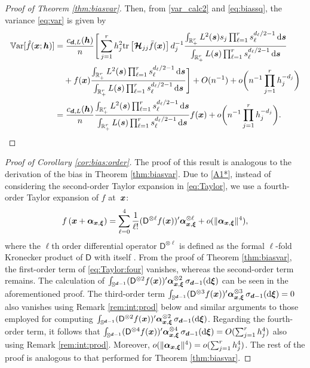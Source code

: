 \documentclass[oneside,11pt]{article}
\begin{document}
\begin{proof}[Proof of Theorem \ref{thm:biasvar}]
Then, from \eqref{var_calc2} and \eqref{eq:biassq}, the variance \eqref{eq:var} is given by
\begin{align*}
	\mathbb{V}\mathrm{ar}[\hat{f}(\bx;\bh)]=&\;\frac{c_{\bd,L}(\bh)}{n}
	\Bigg[\sum_{j=1}^rh_j^2\tr{\bHcal_{jj}\bar{f}(\bx)}d_j^{-1}\frac{\int_{\R_+^r}L^2(\bs)s_j\prod_{\ell=1}^r s_\ell^{d_\ell/2-1}\,\rd \bs}{\int_{\R_+^r}L(\bs)\prod_{\ell=1}^rs_\ell^{d_\ell/2-1}\,\rd \bs}\nonumber\\
        &+ f(\bx)\frac{\int_{\R_+^r}L^2(\bs)\prod_{\ell=1}^r s_\ell^{d_\ell/2-1}\,\rd \bs}{\int_{\R_+^r}L(\bs)\prod_{\ell=1}^rs_\ell^{d_\ell/2-1}\,\rd \bs}\Bigg]%
        +O(n^{-1})+o\bigg(n^{-1}\prod_{j=1}^r h_j^{-d_j}\bigg)\nonumber\\
	=&\;\frac{c_{\bd,L}(\bh)}{n} \frac{\int_{\R_+^r}L^2(\bs)\prod_{\ell=1}^r s_\ell^{d_\ell/2-1}\,\rd \bs}{\int_{\R_+^r}L(\bs)\prod_{\ell=1}^rs_\ell^{d_\ell/2-1}\,\rd \bs}f(\bx)+o\bigg(n^{-1}\prod_{j=1}^r h_j^{-d_j}\bigg).
\end{align*}
\end{proof}

\begin{proof}[Proof of Corollary \ref{cor:bias:order}]
The proof of this result is analogous to the derivation of the bias in Theorem \ref{thm:biasvar}. Due to \ref{A1*}, instead of considering the second-order Taylor expansion in \eqref{eq:Taylor}, we use a fourth-order Taylor expansion of $f$ at~$\boldsymbol{x}$:
\begin{align}\label{eq:Taylor:four}
f\left(\boldsymbol{x}+\boldsymbol\alpha_{\boldsymbol{x},\boldsymbol\xi}\right)=\sum_{\ell=0}^4\frac{1}{\ell!}(\mathsf{D}^{\otimes \ell}f(\boldsymbol{x}))'\boldsymbol\alpha_{\boldsymbol{x},\boldsymbol\xi}^{\otimes \ell}+o(\|\boldsymbol\alpha_{\boldsymbol{x},\boldsymbol\xi}\|^4),
\end{align}
where the $\ell$th order differential operator $\mathsf{D}^{\otimes \ell}$ is defined as the formal $\ell$-fold Kronecker product of $\mathsf{D}$ with itself \citep[Section 2.6]{Chacon2018}. From the proof of Theorem \ref{thm:biasvar}, the first-order term of \eqref{eq:Taylor:four} vanishes, whereas the second-order term remains. The calculation of $\int_{\mathbb{S}^{\boldsymbol{d}-1}}(\mathsf{D}^{\otimes 2}f(\boldsymbol{x}))'\boldsymbol\alpha_{\boldsymbol{x},\boldsymbol\xi}^{\otimes 2}\,\sigma_{\boldsymbol{d}-1}(\mathrm{d}\boldsymbol\xi)$ can be seen in the aforementioned proof. The third-order term $\int_{\mathbb{S}^{\boldsymbol{d}-1}}(\mathsf{D}^{\otimes 3}f(\boldsymbol{x}))'\boldsymbol\alpha_{\boldsymbol{x},\boldsymbol\xi}^{\otimes 3}\,\sigma_{\boldsymbol{d}-1}(\mathrm{d}\boldsymbol\xi)=0$ also vanishes using Remark \ref{rem:int:prod} below and similar arguments to those employed for computing $\int_{\mathbb{S}^{\boldsymbol{d}-1}}(\mathsf{D}^{\otimes 2}f(\boldsymbol{x}))'\boldsymbol\alpha_{\boldsymbol{x},\boldsymbol\xi}^{\otimes 2}\,\sigma_{\boldsymbol{d}-1}(\mathrm{d}\boldsymbol\xi)$. Regarding the fourth-order term, it follows that $\int_{\mathbb{S}^{\boldsymbol{d}-1}}(\mathsf{D}^{\otimes 4}f(\boldsymbol{x}))'\boldsymbol\alpha_{\boldsymbol{x},\boldsymbol\xi}^{\otimes 4}\,\sigma_{\boldsymbol{d}-1}(\mathrm{d}\boldsymbol\xi)=O(\sum_{j=1}^r h_j^4)$ also using Remark \ref{rem:int:prod}. Moreover, $o(\|\boldsymbol\alpha_{\boldsymbol{x},\boldsymbol\xi}\|^4)=o(\sum_{j=1}^r h_j^4)$. The rest of the proof is analogous to that performed for Theorem \ref{thm:biasvar}.
\end{proof}
\end{document}
